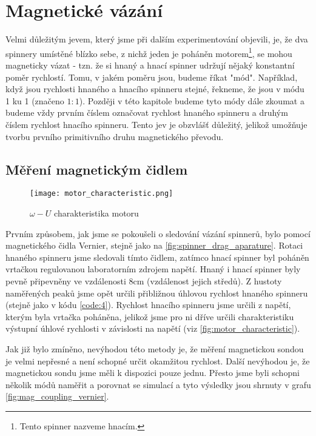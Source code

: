 \chapter{Magnetické vázání}

Velmi důležitým jevem, který jsme při dalším experimentování objevili, je, že dva spinnery umístěné blízko sebe, z nichž jeden je poháněn motorem\footnote{Tento spinner nazveme hnacím.}, se mohou magneticky vázat - tzn. že si hnaný a hnací spinner udržují nějaký konstantní poměr rychlostí.
Tomu, v jakém poměru jsou, budeme říkat "mód". Například, když jsou rychlosti hnaného a hnacího spinneru stejné, řekneme, že jsou v módu 1 ku 1 (značeno $1:1$). Později v této kapitole budeme tyto módy dále zkoumat a budeme vždy prvním číslem označovat rychlost hnaného spinneru a druhým číslem rychlost hnacího spinneru. Tento jev je obzvlášť důležitý, jelikož umožňuje tvorbu prvního primitivního druhu magnetického převodu.

\section{Měření magnetickým čidlem}

\begin{wrapfigure}{r}{0.5\textwidth}
    \texttt{[image: motor\_characteristic.png]}
    \centering
    \caption[$\omega - U$ charakteristika motoru]{$\omega - U$ charakteristika motoru}
    \label{fig:motor_characteristic}
\end{wrapfigure}

Prvním způsobem, jak jsme se pokoušeli o sledování vázání spinnerů, bylo pomocí magnetického čidla Vernier, stejně jako na \autoref{fig:spinner_drag_aparature}. Rotaci hnaného spinneru jsme sledovali tímto čidlem, zatímco hnací spinner byl poháněn vrtačkou regulovanou laboratorním zdrojem napětí. Hnaný i hnací spinner byly pevně připevněny ve vzdálenosti 8cm (vzdálenost jejich středů).
Z hustoty naměřených peaků jsme opět určili přibližnou úhlovou rychlost hnaného spinneru (stejně jako v kódu \ref{code:4}). Rychlost hnacího spinneru jsme určili z napětí, kterým byla vrtačka poháněna, jelikož jsme pro ni dříve určili charakteristiku výstupní úhlové rychlosti v závislosti na napětí (viz \autoref{fig:motor_characteristic}).

Jak již bylo zmíněno, nevýhodou této metody je, že měření magnetickou sondou je velmi nepřesné a není schopné určit okamžitou rychlost. Další nevýhodou je, že magnetickou sondu jsme měli k dispozici pouze jednu. Přesto jsme byli schopni několik módů naměřit a porovnat se simulací a tyto výsledky jsou shrnuty v grafu \ref{fig:mag_coupling_vernier}.

